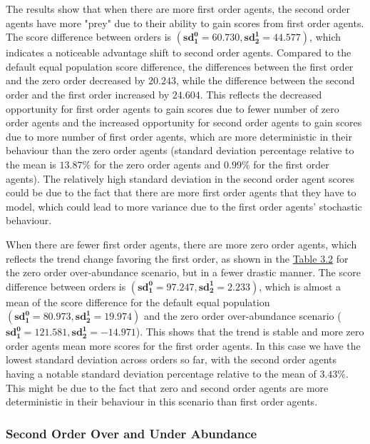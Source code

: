 The results show that when there are more first order agents, the second order agents have more "prey" due to their ability to gain scores from first order agents. The score difference between orders is $(\mathbf{sd^0_1 = 60.730}, \mathbf{sd^1_2 = 44.577})$, which indicates a noticeable advantage shift to second order agents. Compared to the default equal population score difference, the differences between the first order and the zero order decreased by $\mathbf{20.243}$, while the difference between the second order and the first order increased by $\mathbf{24.604}$. This reflects the decreased opportunity for first order agents to gain scores due to fewer number of zero order agents and the increased opportunity for second order agents to gain scores due to more number of first order agents, which are more deterministic in their behaviour than the zero order agents (standard deviation percentage relative to the mean is $\mathbf{13.87\%}$ for the zero order agents and $\mathbf{0.99\%}$ for the first order agents). The relatively high standard deviation in the second order agent scores could be due to the fact that there are more first order agents that they have to model, which could lead to more variance due to the first order agents' stochastic behaviour.

When there are fewer first order agents, there are more zero order agents, which reflects the trend change favoring the first order, as shown in the \hyperref[table:non-sig-zero-order-simple]{Table 3.2} for the zero order over-abundance scenario, but in a fewer drastic manner. The score difference between orders is $(\mathbf{sd^0_1 = 97.247}, \mathbf{sd^1_2 = 2.233})$, which is almost a mean of the score difference for the default equal population $(\mathbf{sd^0_1 = 80.973}, \mathbf{sd^1_2 = 19.974})$ and the zero order over-abundance scenario ($\mathbf{sd^0_1 = 121.581}, \mathbf{sd^1_2 = -14.971}$). This shows that the trend is stable and more zero order agents mean more scores for the first order agents. In this case we have the lowest standard deviation across orders so far, with the second order agents having a notable standard deviation percentage relative to the mean of $\mathbf{3.43\%}$. This might be due to the fact that zero and second order agents are more deterministic in their behaviour in this scenario than first order agents.


\subsubsection{Second Order Over and Under Abundance}

